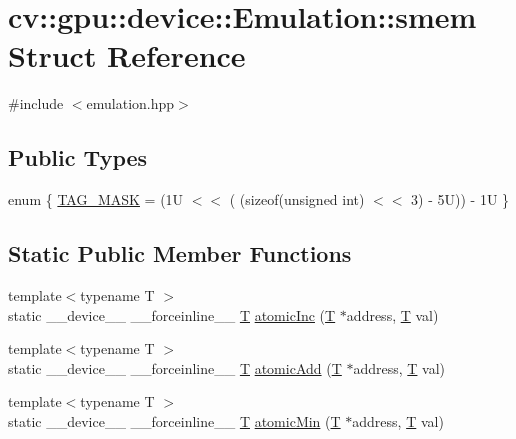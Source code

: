 \hypertarget{structcv_1_1gpu_1_1device_1_1Emulation_1_1smem}{\section{cv\-:\-:gpu\-:\-:device\-:\-:Emulation\-:\-:smem Struct Reference}
\label{structcv_1_1gpu_1_1device_1_1Emulation_1_1smem}
}


{\ttfamily \#include $<$emulation.\-hpp$>$}

\subsection*{Public Types}
\begin{DoxyCompactItemize}
\item 
enum \{ \hyperlink{structcv_1_1gpu_1_1device_1_1Emulation_1_1smem_a8eba482dd7c327f2a8b1b163265a475da9341d37935a5eda90ed8190edc062f9f}{T\-A\-G\-\_\-\-M\-A\-S\-K} = (1\-U $<$$<$ ( (sizeof(unsigned int) $<$$<$ 3) -\/ 5\-U)) -\/ 1\-U
 \}
\end{DoxyCompactItemize}
\subsection*{Static Public Member Functions}
\begin{DoxyCompactItemize}
\item 
{\footnotesize template$<$typename T $>$ }\\static \-\_\-\-\_\-device\-\_\-\-\_\- \-\_\-\-\_\-forceinline\-\_\-\-\_\- \hyperlink{calib3d_8hpp_a3efb9551a871ddd0463079a808916717}{T} \hyperlink{structcv_1_1gpu_1_1device_1_1Emulation_1_1smem_a69ba2389a4a1751e3b66ce97752a43f3}{atomic\-Inc} (\hyperlink{calib3d_8hpp_a3efb9551a871ddd0463079a808916717}{T} $\ast$address, \hyperlink{calib3d_8hpp_a3efb9551a871ddd0463079a808916717}{T} val)
\item 
{\footnotesize template$<$typename T $>$ }\\static \-\_\-\-\_\-device\-\_\-\-\_\- \-\_\-\-\_\-forceinline\-\_\-\-\_\- \hyperlink{calib3d_8hpp_a3efb9551a871ddd0463079a808916717}{T} \hyperlink{structcv_1_1gpu_1_1device_1_1Emulation_1_1smem_a7e9874b99f53c69cfa780cc99259969f}{atomic\-Add} (\hyperlink{calib3d_8hpp_a3efb9551a871ddd0463079a808916717}{T} $\ast$address, \hyperlink{calib3d_8hpp_a3efb9551a871ddd0463079a808916717}{T} val)
\item 
{\footnotesize template$<$typename T $>$ }\\static \-\_\-\-\_\-device\-\_\-\-\_\- \-\_\-\-\_\-forceinline\-\_\-\-\_\- \hyperlink{calib3d_8hpp_a3efb9551a871ddd0463079a808916717}{T} \hyperlink{structcv_1_1gpu_1_1device_1_1Emulation_1_1smem_ae72c3596905e3ca880b82471ef1d0a4e}{atomic\-Min} (\hyperlink{calib3d_8hpp_a3efb9551a871ddd0463079a808916717}{T} $\ast$address, \hyperlink{calib3d_8hpp_a3efb9551a871ddd0463079a808916717}{T} val)
\end{DoxyCompactItemize}



